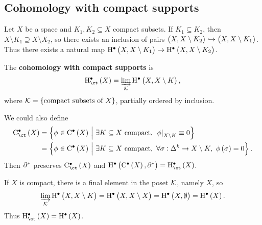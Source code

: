 \subsection{Cohomology with compact supports}

Let $ X $ be a space and $ K_1, K_2 \subseteq X $ compact subsets. If $ K_1 \subseteq K_2 $, then $ X \setminus K_1 \supseteq X \setminus X_2 $, so there exists an inclusion of pairs $ \br{X, X \setminus K_2} \hookrightarrow \br{X, X \setminus K_1} $. Thus there exists a natural map $ \H^\bullet\br{X, X \setminus K_1} \to \H^\bullet\br{X, X \setminus K_2} $.

\begin{definition*}
The \textbf{cohomology with compact supports} is
$$ \Hc^\bullet\br{X} = \varinjlim_\KKK \H^\bullet\br{X, X \setminus K}, $$
where $ \KKK = \cbr{\text{compact subsets of} \ X} $, partially ordered by inclusion.
\end{definition*}

\begin{remark*}
We could also define
\begin{align*}
\C_{\ct}^\bullet\br{X}
& = \cbr{\phi \in \C^\bullet\br{X} \st \exists K \subseteq X \ \text{compact}, \ \eval{\phi}_{X \setminus K} \equiv 0} \\
& = \cbr{\phi \in \C^\bullet\br{X} \st \exists K \subseteq X \ \text{compact}, \ \forall \sigma : \Delta^k \to X \setminus K, \ \phi\br{\sigma} = 0}.
\end{align*}
Then $ \partial^* $ preserves $ \C_{\ct}^\bullet\br{X} $ and $ \H^\bullet\br{\C^\bullet\br{X}, \da^*} = \Hc^\bullet\br{X} $.
\end{remark*}

\pagebreak

\begin{example*}
If $ X $ is compact, there is a final element in the poset $ \mathcal{K} $, namely $ X $, so
$$ \varinjlim_\KKK \H^\bullet\br{X, X \setminus K} = \H^\bullet\br{X, X \setminus X} = \H^\bullet\br{X, \emptyset} = \H^\bullet\br{X}. $$
Thus $ \Hc^\bullet\br{X} = \H^\bullet\br{X} $.
\end{example*}

